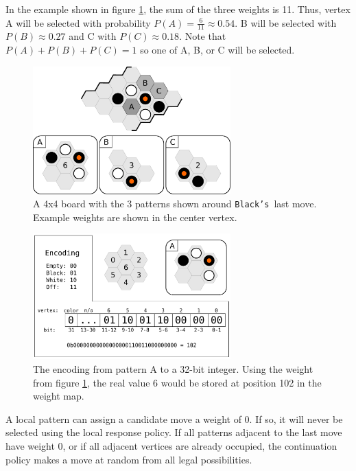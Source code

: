 \documentclass{acm_proc_article-sp}
\newcommand{\hblacks}{\texttt{Black's}}
\begin{document}
In the example shown in figure \ref{fig:localpattern}, the sum of the three weights is 11. Thus, vertex A will be selected with probability $P(A) = \frac{6}{11} \approx 0.54$. 
B will be selected with $P(B) \approx 0.27$ and C with $P(C) \approx 0.18$. 
Note that $P(A)+P(B)+P(C) = 1$ so one of A, B, or C will be selected. 

\begin{figure}
	\begin{center}
	\includegraphics[width=3.0in]{graphics/local-pattern.pdf}
	\caption{A 4x4 board with the 3 patterns shown around \hblacks\ last move. Example weights are shown in the center vertex.}
	\label{fig:localpattern}
	\end{center}
\end{figure}

\begin{figure}
	\begin{center}
	\includegraphics[width=3.0in]{graphics/weight-pattern-map.pdf}
	\caption{The encoding from pattern A to a 32-bit integer. Using the weight from figure \ref{fig:localpattern}, the real value 6 would be stored at position 102 in the weight map.}
	\label{fig:encoding}
	\end{center}
\end{figure}

A local pattern can assign a candidate move a weight of 0. If so, it will never be selected using the local response policy. 
If all patterns adjacent to the last move have weight 0, or if all adjacent vertices are already occupied, 
the continuation policy makes a move at random from all legal possibilities.
\end{document}
